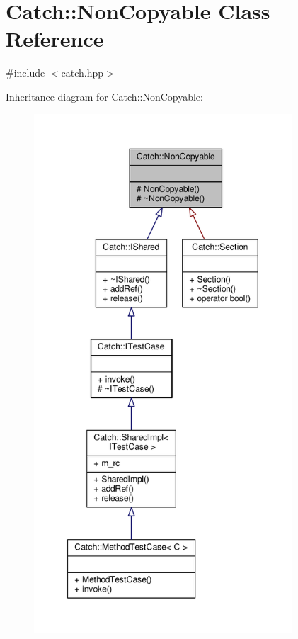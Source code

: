 \hypertarget{class_catch_1_1_non_copyable}{\section{Catch\-:\-:Non\-Copyable Class Reference}
\label{class_catch_1_1_non_copyable}
}


{\ttfamily \#include $<$catch.\-hpp$>$}



Inheritance diagram for Catch\-:\-:Non\-Copyable\-:
\nopagebreak
\begin{figure}[H]
\begin{center}
\leavevmode
\includegraphics[height=550pt]{class_catch_1_1_non_copyable__inherit__graph}
\end{center}
\end{figure}


